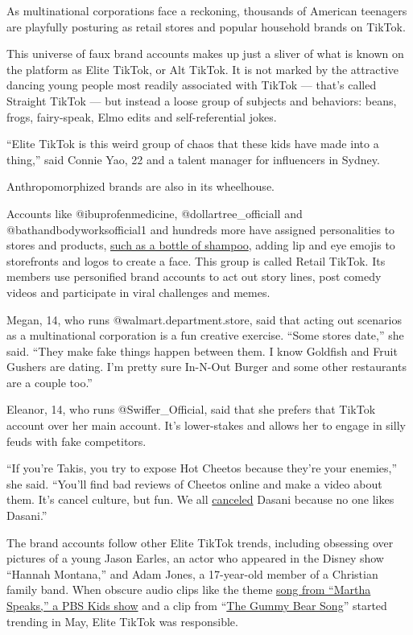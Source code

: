 As multinational corporations face a reckoning, thousands of American
teenagers are playfully posturing as retail stores and popular household
brands on TikTok.

This universe of faux brand accounts makes up just a sliver of what is
known on the platform as Elite TikTok, or Alt TikTok. It is not marked
by the attractive dancing young people most readily associated with
TikTok --- that's called Straight TikTok --- but instead a loose group
of subjects and behaviors: beans, frogs, fairy-speak, Elmo edits and
self-referential jokes.

``Elite TikTok is this weird group of chaos that these kids have made
into a thing,'' said Connie Yao, 22 and a talent manager for influencers
in Sydney.

Anthropomorphized brands are also in its wheelhouse.

Accounts like @ibuprofenmedicine, @dollartree\_officiall and
@bathandbodyworksofficial1 and hundreds more have assigned personalities
to stores and products,
\href{https://www.tiktok.com/@theofficialpantene}{such as a bottle of
shampoo}, adding lip and eye emojis to storefronts and logos to create a
face. This group is called Retail TikTok. Its members use personified
brand accounts to act out story lines, post comedy videos and
participate in viral challenges and memes.

Megan, 14, who runs @walmart.department.store, said that acting out
scenarios as a multinational corporation is a fun creative exercise.
``Some stores date,'' she said. ``They make fake things happen between
them. I know Goldfish and Fruit Gushers are dating. I'm pretty sure
In-N-Out Burger and some other restaurants are a couple too.''

Eleanor, 14, who runs @Swiffer\_Official, said that she prefers that
TikTok account over her main account. It's lower-stakes and allows her
to engage in silly feuds with fake competitors.

``If you're Takis, you try to expose Hot Cheetos because they're your
enemies,'' she said. ``You'll find bad reviews of Cheetos online and
make a video about them. It's cancel culture, but fun. We all
\href{https://www.nytimes.com/2018/06/28/style/is-it-canceled.html}{canceled}
Dasani because no one likes Dasani.''

The brand accounts follow other Elite TikTok trends, including obsessing
over pictures of a young Jason Earles, an actor who appeared in the
Disney show ``Hannah Montana,'' and Adam Jones, a 17-year-old member of
a Christian family band. When obscure audio clips like the theme
\href{https://www.youtube.com/watch?v=jSdc55Y3UnU}{song from ``Martha
Speaks,'' a PBS Kids show} and a clip from
``\href{https://www.youtube.com/watch?v=astISOttCQ0}{The Gummy Bear
Song}'' started trending in May, Elite TikTok was responsible.

